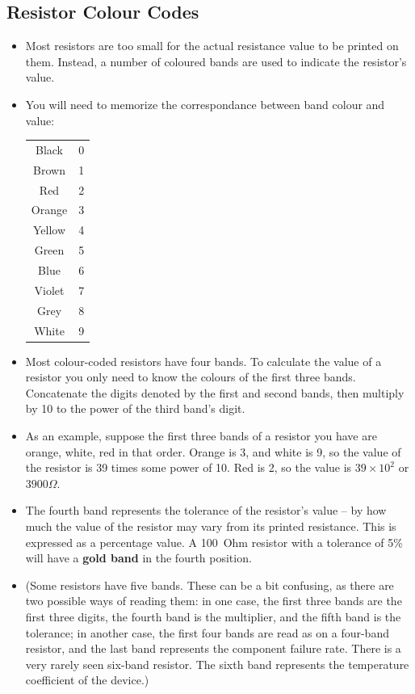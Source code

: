 \documentclass[letterpaper,12pt]{scrartcl}
\begin{document}
\subsection{Resistor Colour Codes}

\begin{itemize}
\item Most resistors are too small for the actual resistance value to be printed on them. Instead, a number of coloured bands are used to indicate
the resistor's value.
\item You will need to memorize the correspondance between band colour and value:

\begin{tabular}{|c|c|}
\hline
Black & 0 \\
Brown & 1 \\
Red & 2 \\
Orange & 3 \\
Yellow & 4 \\
Green & 5 \\
Blue & 6 \\
Violet & 7 \\
Grey & 8 \\
White & 9 \\
\hline
\end{tabular}

\item Most colour-coded resistors have four bands. To calculate the value of a resistor
you only need to know the colours of the first three bands.
Concatenate the digits denoted by the first and second bands, then multiply by 10 to the power of
the third band's digit.
\item As an example, suppose the first three bands of a resistor you have are orange, white, red in that order.
Orange is 3, and white is 9, so the value of the resistor is 39 times some power of 10.
Red is 2, so the value is $39 \times 10^{2}$ or $3900\Omega$.
\item The fourth band represents the tolerance of the resistor's value -- by how much the value of the resistor may vary
from its printed resistance. This is expressed as a percentage value. A 100~Ohm resistor with a tolerance of 5\% will have a \textbf{gold band}
in the fourth position.
\item (Some resistors have five bands. These can be a bit confusing, as there are
two possible ways of reading them: in one case, the first three bands are the first three digits, 
the fourth band is the multiplier, and the fifth band is the tolerance;
in another case, the first four bands are read as on a four-band resistor, and the last band
represents the component failure rate.
There is a very rarely seen six-band resistor. The sixth band represents the temperature coefficient of the device.)
\end{itemize}
\end{document}
